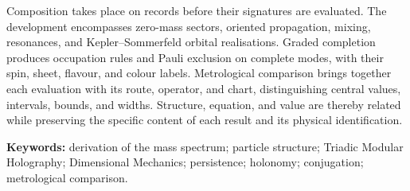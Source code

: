 Composition takes place on records before their signatures are evaluated.
The development encompasses zero-mass sectors, oriented propagation,
mixing, resonances, and Kepler--Sommerfeld orbital realisations. Graded
completion produces occupation rules and Pauli exclusion on complete
modes, with their spin, sheet, flavour, and colour labels. Metrological
comparison brings together each evaluation with its route, operator,
and chart, distinguishing central values, intervals, bounds, and widths.
Structure, equation, and value are thereby related while preserving the
specific content of each result and its physical identification.

\noindent\textbf{Keywords:} derivation of the mass spectrum; particle
structure; Triadic Modular Holography; Dimensional Mechanics; persistence;
holonomy; conjugation; metrological comparison.
\par\endgroup
